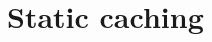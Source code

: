\documentclass{book}
\begin{document}
\part{Static caching}
\label{part:static}



\cleardoublepage
{}
{}



\end{document}
